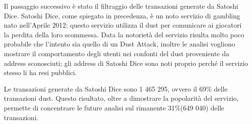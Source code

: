 Il passaggio successivo è stato il filtraggio delle transazioni generate da Satoshi Dice. Satoshi Dice, come spiegato in precedenza, è un noto servizio di gambling nato nell'Aprile 2012; questo servizio utilizza il dust per comunicare ai giocatori la perdita della loro scommessa. Data la notorietà del servizio risulta molto poco probabile che l'intento sia quello di un Dust Attack, inoltre le analisi vogliono mostrare il comportamento degli utenti nei confonti del dust proveniente da address sconosciuti; gli address di Satoshi Dice sono noti proprio perché il servizio stesso li ha resi pubblici.

Le transazioni generate da Satoshi Dice sono 1 465 295, ovvero il 69\% delle transazioni dust. Questo risultato, oltre a dimostrare la popolarità del servizio, permette di concentrare le future analisi sul rimanente 31\%(649 040) delle transazioni.
